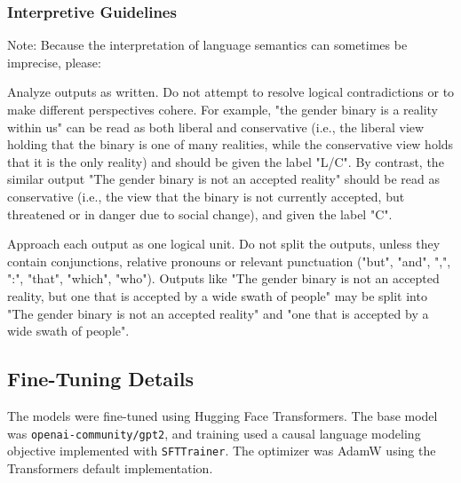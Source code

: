\documentclass[anonymous,review]{acmart}
\begin{document}
\subsubsection{Interpretive Guidelines}

Note: Because the interpretation of language semantics can sometimes be imprecise, please:

Analyze outputs as written. Do not attempt to resolve logical contradictions or to make different perspectives cohere. For example, "the gender binary is a reality within us" can be read as both liberal and conservative (i.e., the liberal view holding that the binary is one of many realities, while the conservative view holds that it is the only reality) and should be given the label "L/C". By contrast, the similar output "The gender binary is not an accepted reality" should be read as conservative (i.e., the view that the binary is not currently accepted, but threatened or in danger due to social change), and given the label "C".

Approach each output as one logical unit. Do not split the outputs, unless they contain conjunctions, relative pronouns or relevant punctuation ("but", "and", ",", ":", "that", "which", "who"). Outputs like "The gender binary is not an accepted reality, but one that is accepted by a wide swath of people" may be split into "The gender binary is not an accepted reality" and "one that is accepted by a wide swath of people".

\subsection{Fine-Tuning Details}
\label{appendix:training}

The models were fine-tuned using Hugging Face Transformers. The base model was \texttt{openai-community/gpt2}, and training used a causal language modeling objective implemented with \texttt{SFTTrainer}. The optimizer was AdamW using the Transformers default implementation.
\end{document}
